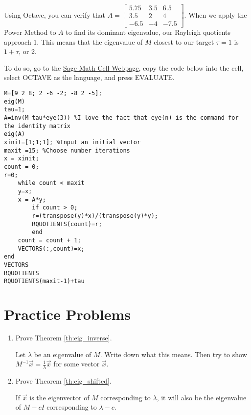 \documentclass{ximera}
\begin{document}
Using Octave, you can verify that $A=\left[ \begin{array}{rrr}
5.75 & 3.5 & 6.5 \\
3.5 & 2 & 4 \\
-6.5 & -4 & -7.5
\end{array}\right]$.  When we apply the Power Method to $A$ to find its dominant eigenvalue, our Rayleigh quotients approach 1.  This means that the eigenvalue of $M$ closest to our target $\tau = 1$ is $1+\tau$, or 2.

To do so, go to the \href{https://sagecell.sagemath.org/}{Sage Math Cell Webpage}, copy the code below into the cell, select OCTAVE as the language, and press EVALUATE.
\begin{verbatim}
M=[9 2 8; 2 -6 -2; -8 2 -5];
eig(M)
tau=1;
A=inv(M-tau*eye(3)) %I love the fact that eye(n) is the command for the identity matrix
eig(A)
xinit=[1;1;1]; %Input an initial vector
maxit =15; %Choose number iterations
x = xinit;
count = 0;
r=0;
    while count < maxit
    y=x;
    x = A*y;
        if count > 0; 
        r=(transpose(y)*x)/(transpose(y)*y);
        RQUOTIENTS(count)=r;
        end
    count = count + 1;
    VECTORS(:,count)=x;
end
VECTORS
RQUOTIENTS
RQUOTIENTS(maxit-1)+tau
\end{verbatim}

\section*{Practice Problems}

\begin{problem}\label{prob:complete_eig_proofs}

\begin{enumerate}
    \item Prove Theorem \ref{th:eig_inverse}.
    \begin{hint}
    Let $\lambda$ be an eigenvalue of $M$.  Write down what this means.  Then try to show $M^{-1}\vec{x} = \frac{1}{\lambda}\vec{x}$ for some vector $\vec{x}$.
    \end{hint}
    
    \item Prove Theorem \ref{th:eig_shifted}.
    \begin{hint}
    If $\vec{x}$ is the eigenvector of $M$ corresponding to $\lambda$, it will also be the eigenvalue of $M-cI$ corresponding to $\lambda - c$. 
    \end{hint}
\end{enumerate}

\end{problem}
\end{document}
